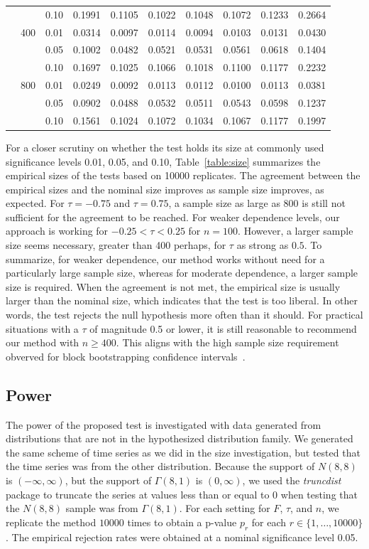 \documentclass[12pt]{article}
\begin{document}
\begin{table}[tbp]
\begin{tabular}{ccc ccc c ccc}
  & & 0.10 & 0.1991 & 0.1105 & 0.1022 & 0.1048 & 0.1072 & 0.1233 & 0.2664 \\
  & {400} & 0.01 & 0.0314 & 0.0097 & 0.0114 & 0.0094 & 0.0103 & 0.0131 & 0.0430 \\
  & & 0.05 & 0.1002 & 0.0482 & 0.0521 & 0.0531 & 0.0561 & 0.0618 & 0.1404 \\
  & & 0.10 & 0.1697 & 0.1025 & 0.1066 & 0.1018 & 0.1100 & 0.1177 & 0.2232 \\
  & {800} & 0.01 & 0.0249 & 0.0092 & 0.0113 & 0.0112 & 0.0100 & 0.0113 & 0.0381 \\
  & & 0.05 & 0.0902 & 0.0488 & 0.0532 & 0.0511 & 0.0543 & 0.0598 & 0.1237 \\
  & & 0.10 & 0.1561 & 0.1024 & 0.1072 & 0.1034 & 0.1067 & 0.1177 & 0.1997 \\
   \bottomrule
\end{tabular}
\end{table}

For a closer scrutiny on whether the test holds its size at commonly used
significance levels 0.01, 0.05, and 0.10, Table~\ref{table:size}
summarizes the empirical sizes of the tests based on 10000 replicates.
The agreement between the empirical sizes and the nominal size
improves as sample size improves, as expected. For $\tau = -0.75$
and $\tau = 0.75$, a sample size as large as 800 is still not sufficient for the
agreement to be reached. For weaker dependence levels, our approach is working
for $-0.25 < \tau < 0.25$ for $n = 100$. However, a larger sample size seems
necessary, greater than 400 perhaps, for $\tau$ as strong as $0.5$. To
summarize, for weaker dependence, our method works without need for a
particularly large sample size, whereas for moderate dependence, a larger sample
size is required. When the agreement is not met, the empirical size is
usually larger than the nominal size, which indicates that the test is too liberal.
In other words, the test rejects the null hypothesis more often than it should.
For practical situations with a $\tau$ of magnitude 0.5 or
lower, it is still reasonable to recommend our method with $n \ge 400$.
This aligns with the high sample size requirement obverved for block
bootstrapping confidence intervals~\citep{chandy2024sample}.


\subsection{Power}
The power of the proposed test is investigated with data generated from
distributions that are not in the hypothesized distribution family.
We generated the same scheme of time series as we did in the size investigation,
but tested that the time series was from the other distribution.
Because the support of $N(8, 8)$ is
$(-\infty, \infty)$, but the support of $\Gamma(8, 1)$ is $(0, \infty)$, we used
the \textsl{truncdist} package \citep{truncdist} to truncate the series at
values less than or equal to 0 when testing that the $N(8, 8)$ sample was
from $\Gamma(8, 1)$. For each setting for $F$, $\tau$, and $n$, we replicate the
method $10000$ times
to obtain a p-value $p_r$ for each $r \in \{1, \ldots, 10000\}$.
The empirical rejection rates were obtained at a nominal significance level 0.05.
\end{document}
